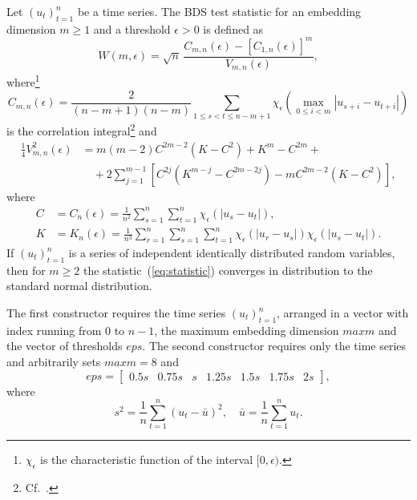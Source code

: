 \documentclass[a4paper,11pt]{article}
\begin{document}
Let $(u_t)_{t = 1}^n$ be a time series. The BDS test statistic for an
embedding dimension $m \geq 1$ and a threshold $\epsilon > 0$ is
defined as
\begin{equation} \label{eq:statistic}
  W(m, \epsilon) = \sqrt{n} \, \frac{C_{m, n}(\epsilon) - [C_{1,
        n}(\epsilon)]^m} {V_{m, n}(\epsilon)},
\end{equation}
where\footnote{$\chi_{\epsilon}$ is the characteristic function of the
  interval $[0, \epsilon)$.}
\begin{equation} \label{eq:Cmn}
  C_{m, n}(\epsilon) = \frac{2}{(n - m + 1)(n - m)} \sum_{1 \leq s < t
    \leq n - m + 1} \chi_{\epsilon} \left( \max_{0 \leq i < m} |u_{s +
    i} - u_{t + i}| \right)
\end{equation}
is the correlation integral\footnote{Cf.~\cite [p.~120]
  {baker-gollub-1998}.} and
\begin{equation} \label{eq:bds2.11}
  \begin{split}
  \frac{1}{4}V_{m, n}^2(\epsilon) &= m(m - 2) C^{2m - 2} (K - C^2) +
  K^m - C^{2m} + \\
  & \quad + 2 \sum_{j = 1}^{m - 1} \left[ C^{2j} (K^{m - j} - C^{2m -
      2j}) - mC^{2m -2} (K - C^2) \right],
  \end{split}
\end{equation}
where
\begin{align} \label{eq:bds2.12}
  C &= C_n(\epsilon) = \frac{1}{n^2} \sum_{s = 1}^n \sum_{t = 1}^n
  \chi_{\epsilon}(|u_s - u_t|), \\
  \label{eq:bds2.13}
  K &= K_n(\epsilon) = \frac{1}{n^3} \sum_{r = 1}^n \sum_{s = 1}^n
  \sum_{t = 1}^n \chi_{\epsilon}(|u_r - u_s|) \chi_{\epsilon}(|u_s -
  u_t|).
\end{align}
If $(u_t)_{t = 1}^n$ is a series of independent identically
distributed random variables, then for $m \geq 2$ the
statistic~(\ref{eq:statistic}) converges in distribution to the
standard normal distribution.

The first constructor requires the time series $(u_t)_{t = 1}^{n}$,
arranged in a vector with index running from 0 to $n - 1$, the maximum
embedding dimension $\mathit{maxm}$ and the vector of thresholds
$\mathit{eps}$. The second constructor requires only the time series
and arbitrarily sets $\mathit{maxm} = 8$ and \[ \mathit{eps}
= \begin{bmatrix} 0.5s & 0.75s & s & 1.25s & 1.5s & 1.75s &
  2s \end{bmatrix}, \] where
\begin{equation} \label{eq:mean_var}
  s^2 = \frac{1}{n} \sum_{t = 1}^n (u_t - \bar{u})^2, \quad
  \bar{u} = \frac{1}{n} \sum_{t = 1}^n u_t.
\end{equation}
\end{document}
